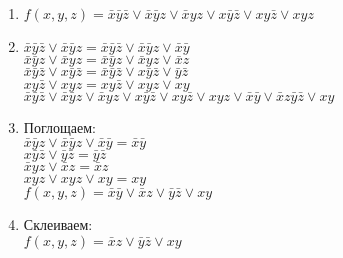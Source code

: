 \documentclass[a4paper, 12pt]{report}
\begin{document}
\begin{enumerate}
	\item $f(x, y, z) = \bar x \bar y \bar z \vee \bar x \bar y z \vee \bar x y z \vee x \bar y \bar z \vee x y \bar z \vee x y z$
	\item $ \bar x \bar y \bar z \vee \bar x \bar y z = \bar x \bar y \bar z \vee \bar x \bar y z \vee \bar x \bar y$\\
	$\bar x \bar y z \vee \bar x y z = \bar x \bar y z \vee \bar x y z \vee \bar x z$\\
	$\bar x \bar y \bar z \vee x \bar y \bar z = \bar x \bar y \bar z \vee x \bar y \bar z \vee \bar y \bar z $\\
	$x y \bar z \vee x y z = x y \bar z \vee x y z \vee x y$\\
	$\bar x \bar y \bar z \vee \bar x \bar y z \vee \bar x y z \vee x \bar y \bar z \vee x y \bar z \vee x y z \vee \bar x \bar y \vee \bar x z \bar y \bar z \vee x y$
	\item Поглощаем:\\
	$\bar x \bar y z \vee \bar x \bar y z \vee \bar x \bar y = \bar x \bar y$\\
	$x \bar y \bar z \vee \bar y \bar z = \bar y \bar z$\\
	$\bar x y z \vee \bar x z = \bar x z$\\
	$x y z \vee x y z \vee x y = x y$\\
	$f(x, y, z) = \bar x \bar y \vee \bar x z \vee \bar y \bar z \vee x y$
	\item Склеиваем:\\
	$f(x, y, z) =  \bar x z \vee \bar y \bar z \vee x y$
\end{enumerate}
\end{document}
